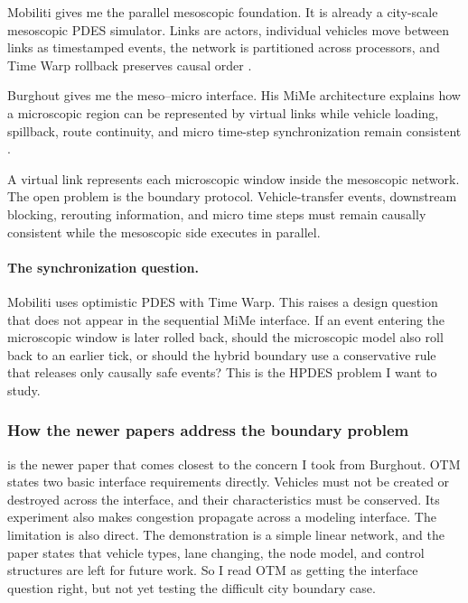 \begin{bibunit}[plainnat]
Mobiliti gives me the parallel mesoscopic foundation. It is already a
city-scale mesoscopic PDES simulator. Links are actors, individual vehicles
move between links as timestamped events, the network is partitioned across
processors, and Time Warp rollback preserves causal order
\citep{chan2023dynamicrerouting}.

Burghout gives me the meso--micro interface. His MiMe architecture explains
how a microscopic region can be represented by virtual links while vehicle
loading, spillback, route continuity, and micro time-step synchronization
remain consistent \citep{burghout2004thesis,burghout2005hybrid}.

A virtual link represents each microscopic window inside the mesoscopic
network. The open problem is the boundary protocol. Vehicle-transfer events,
downstream blocking, rerouting information, and micro time steps must remain
causally consistent while the mesoscopic side executes in parallel.

\paragraph*{The synchronization question.}
Mobiliti uses optimistic PDES with Time Warp. This raises a design question that
does not appear in the sequential MiMe interface. If an event entering the
microscopic window is later rolled back, should the microscopic model also roll
back to an earlier tick, or should the hybrid boundary use a conservative rule
that releases only causally safe events? This is the HPDES problem I want to
study.

\subsubsection{How the newer papers address the boundary problem}

\citet{gomes2022otm} is the newer paper that comes closest to the concern I took from Burghout. OTM states two basic interface requirements directly. Vehicles must not be created or destroyed across the interface, and their characteristics must be conserved. Its experiment also makes congestion propagate across a modeling interface. The limitation is also direct. The demonstration is a simple linear network, and the paper states that vehicle types, lane changing, the node model, and control structures are left for future work. So I read OTM as getting the interface question right, but not yet testing the difficult city boundary case.


\end{bibunit}
